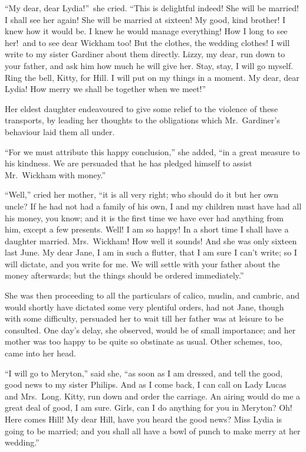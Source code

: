 \documentclass[12pt,english,oneside]{book}
\begin{document}
{}``My dear, dear Lydia!''\ she cried. {}``This is delightful
indeed! She will be married! I shall see her again! She will be married
at sixteen! My good, kind brother! I knew how it would be. I knew
he would manage everything! How I long to see her!\ and to see dear
Wickham too! But the clothes, the wedding clothes! I will write to
my sister Gardiner about them directly. Lizzy, my dear, run down to
your father, and ask him how much he will give her. Stay, stay, I
will go myself. Ring the bell, Kitty, for Hill. I will put on my things
in a moment. My dear, dear Lydia! How merry we shall be together when
we meet!''\ 

Her eldest daughter endeavoured to give some relief to the violence
of these transports, by leading her thoughts to the obligations which
Mr.\ Gardiner's behaviour laid them all under.

{}``For we must attribute this happy conclusion,'' she added, {}``in
a great measure to his kindness. We are persuaded that he has pledged
himself to assist Mr.\ Wickham with money.''

{}``Well,'' cried her mother, {}``it is all very right; who should
do it but her own uncle? If he had not had a family of his own, I
and my children must have had all his money, you know; and it is the
first time we have ever had anything from him, except a few presents.
Well! I am so happy! In a short time I shall have a daughter married.
Mrs.\ Wickham! How well it sounds! And she was only sixteen last
June. My dear Jane, I am in such a flutter, that I am sure I can't
write; so I will dictate, and you write for me. We will settle with
your father about the money afterwards; but the things should be ordered
immediately.''

She was then proceeding to all the particulars of calico, muslin,
and cambric, and would shortly have dictated some very plentiful orders,
had not Jane, though with some difficulty, persuaded her to wait till
her father was at leisure to be consulted. One day's delay, she observed,
would be of small importance; and her mother was too happy to be quite
so obstinate as usual. Other schemes, too, came into her head.

{}``I will go to Meryton,'' said she, {}``as soon as I am dressed,
and tell the good, good news to my sister Philips. And as I come back,
I can call on Lady Lucas and Mrs.\ Long. Kitty, run down and order
the carriage. An airing would do me a great deal of good, I am sure.
Girls, can I do anything for you in Meryton? Oh! Here comes Hill!
My dear Hill, have you heard the good news? Miss Lydia is going to
be married; and you shall all have a bowl of punch to make merry at
her wedding.''
\end{document}
